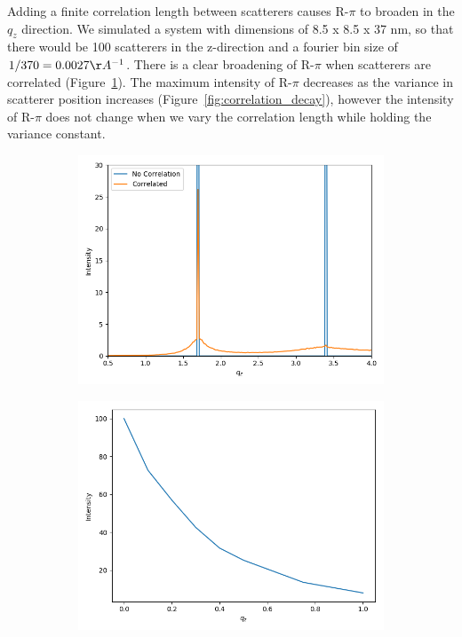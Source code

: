 \documentclass{article}
\begin{document}
  Adding a finite correlation length between scatterers causes R-$\pi$ to
  broaden in the $q_z$ direction. We simulated a system with dimensions of 8.5 x
  8.5 x 37 nm, so that there would be 100 scatterers in the z-direction and a
  fourier bin size of $1/370=0.0027 \AA^{-1}$. There is a clear broadening of
  R-$\pi$ when scatterers are correlated
  (Figure~\ref{fig:correlation_comparison}). The maximum intensity of R-$\pi$
  decreases as the variance in scatterer position increases
  (Figure~\ref{fig:correlation_decay}), however the intensity of R-$\pi$ does not
  change when we vary the correlation length while holding the variance constant. 

  \begin{figure}[!htb]
  \centering
  \begin{subfigure}{0.45\textwidth}
  \includegraphics[width=\textwidth]{correlation.png}
  \caption{}\label{fig:correlation_comparison}
  \end{subfigure}
  \begin{subfigure}{0.45\textwidth}
  \includegraphics[width=\textwidth]{correlation_decay.png}

\end{subfigure}
\end{figure}
\end{document}
